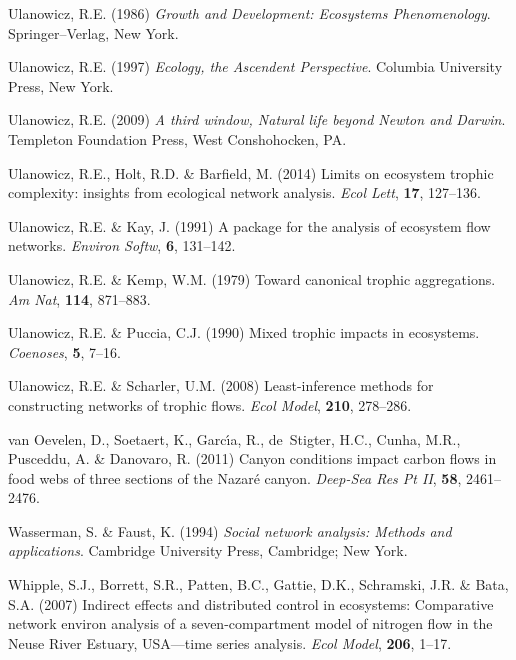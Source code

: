 \documentclass[11pt]{article}
\begin{document}
\begin{thebibliography}{75}
Ulanowicz, R.E. (1986) \emph{Growth and Development: Ecosystems Phenomenology}.
\newblock Springer--Verlag, New York.

Ulanowicz, R.E. (1997) \emph{Ecology, the Ascendent Perspective}.
\newblock Columbia University Press, New York.

Ulanowicz, R.E. (2009) \emph{A third window, {N}atural life beyond {N}ewton and
  {D}arwin}.
\newblock Templeton Foundation Press, West Conshohocken, PA.

Ulanowicz, R.E., Holt, R.D. \& Barfield, M. (2014) Limits on ecosystem trophic
  complexity: insights from ecological network analysis.
\newblock \emph{Ecol Lett}, \textbf{17}, 127--136.

Ulanowicz, R.E. \& Kay, J. (1991) A package for the analysis of ecosystem flow
  networks.
\newblock \emph{Environ Softw}, \textbf{6}, 131--142.

Ulanowicz, R.E. \& Kemp, W.M. (1979) Toward canonical trophic aggregations.
\newblock \emph{Am Nat}, \textbf{114}, 871--883.

Ulanowicz, R.E. \& Puccia, C.J. (1990) Mixed trophic impacts in ecosystems.
\newblock \emph{Coenoses}, \textbf{5}, 7--16.

Ulanowicz, R.E. \& Scharler, U.M. (2008) Least-inference methods for
  constructing networks of trophic flows.
\newblock \emph{Ecol Model}, \textbf{210}, 278--286.

van Oevelen, D., Soetaert, K., Garc{\'\i}a, R., de~Stigter, H.C., Cunha, M.R.,
  Pusceddu, A. \& Danovaro, R. (2011) Canyon conditions impact carbon flows in
  food webs of three sections of the Nazar{\'e} canyon.
\newblock \emph{Deep-Sea Res Pt II}, \textbf{58}, 2461--2476.

Wasserman, S. \& Faust, K. (1994) \emph{Social network analysis: {M}ethods and
  applications}.
\newblock Cambridge University Press, Cambridge; New York.

Whipple, S.J., Borrett, S.R., Patten, B.C., Gattie, D.K., Schramski, J.R. \&
  Bata, S.A. (2007) Indirect effects and distributed control in ecosystems:
  Comparative network environ analysis of a seven-compartment model of nitrogen
  flow in the {Neuse River Estuary, USA}---time series analysis.
\newblock \emph{Ecol Model}, \textbf{206}, 1--17.


\end{thebibliography}
\end{document}
